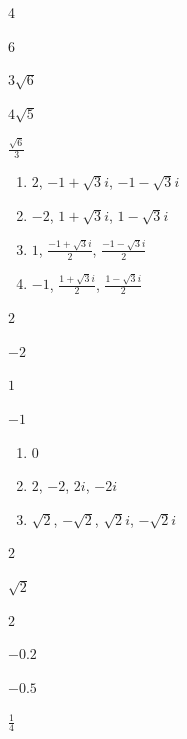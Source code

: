\documentclass{oblivoir}
\begin{document}
\begin{multicols*}{2}
%
\begin{enumerate*}[itemjoin=\hspace{.15\textwidth}]
\item
4
\item
6
\end{enumerate*}

%
\begin{enumerate*}[itemjoin=\hspace{.05\textwidth}]
\item
\(3\sqrt6\)
\item
\(4\sqrt5\)
\item
\(\frac{\sqrt6}3\)
\end{enumerate*}

%
\begin{enumerate}
\item
\(2\), \(-1+\sqrt3i\), \(-1-\sqrt3i\)
\item
\(-2\), \(1+\sqrt3i\), \(1-\sqrt3i\)
\item
\(1\), \(\frac{-1+\sqrt3i}2\), \(\frac{-1-\sqrt3i}2\)
\item
\(-1\), \(\frac{1+\sqrt3i}2\), \(\frac{1-\sqrt3i}2\)
\end{enumerate}

%
\begin{enumerate*}[itemjoin=\hspace{.05\textwidth}]
\item
\(2\)
\item
\(-2\)
\item
\(1\)
\item
\(-1\)
\end{enumerate*}

%
\begin{enumerate}
\item
\(0\)
\item
\(2\), \(-2\), \(2i\), \(-2i\)
\item
\(\sqrt2\), \(-\sqrt2\), \(\sqrt2i\), \(-\sqrt2i\)
\end{enumerate}


%
\begin{enumerate*}[itemjoin=\hspace{.15\textwidth}]
\item
\(2\)
\item
\(\sqrt2\)
\end{enumerate*}

%
\begin{enumerate*}[itemjoin=\quad]
\item
\(2\)
\item
\(-0.2\)
\item
\(-0.5\)
\item
\(\frac14\)
\end{enumerate*}


\end{multicols*}
\end{document}
